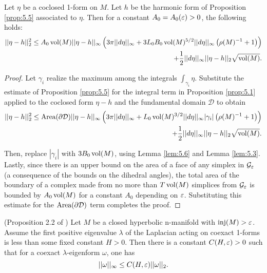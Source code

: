\begin{prop}\label{prop:5.7}
Let $\eta$ be a coclosed 1-form on $M$. Let $h$ be the harmonic form of Proposition \ref{prop:5.5} associated to $\eta$. Then for a constant $A_0 = A_0(\varepsilon)>0$, the following holds:
\begin{align*}
||\eta-h||_2^2 \leq A_0\operatorname{vol}(M)||\eta-h||_{\infty}\left(3\pi||d\eta||_{\infty} + 3L_0B_0\operatorname{vol}(M)^{5/2} ||d\eta||_{\infty} \left(\rho(M)^{-1} + 1\right)\right) \\ + \frac{1}{2}||d\eta||_{\infty}||\eta-h||_2\sqrt{\operatorname{vol}(M)}.
\end{align*}

\end{prop}
\begin{proof}

Let $\gamma_i$ realize the maximum among the integrals $\int_{\gamma_i}\eta$.
Substitute the estimate of Proposition \ref{prop:5.5} for the integral term in Proposition \ref{prop:5.1} applied to the coclosed form $\eta-h$ and the fundamental domain $\mathcal D$ to obtain
\begin{align*}
    ||\eta-h||_2^2 \leq \text{Area}(\partial \mathcal D)||\eta-h||_{\infty}
    \left(3\pi||d\eta||_{\infty} +L_0\operatorname{vol}(M)^{3/2} ||d\eta||_{\infty} |\gamma_i| \left(\rho(M)^{-1} +1 \right)\right) \\ + \frac{1}{2}||d\eta||_{\infty}||\eta-h||_2\sqrt{\operatorname{vol}(M)}.
\end{align*}


Then, replace $|\gamma_i|$ with $3B_0\operatorname{vol}(M)$, using Lemma \ref{lem:5.6} and Lemma \ref{lem:5.3}.
Lastly, since there is an upper bound on the area of a face of any simplex in $\mathcal G_\varepsilon$ (a consequence of the bounds on the dihedral angles), the total area of the boundary of a complex made from no more than $T\operatorname{vol}(M)$ simplices from $\mathcal G_\varepsilon$ is bounded by $A_0\operatorname{vol}(M)$ for a constant $A_0$ depending on $\varepsilon$. Substituting this estimate for the $\text{Area}(\partial \mathcal D)$ term completes the proof.
\end{proof}

\begin{prop}\label{prop:5.8} (Proposition 2.2 of \cite{LS}) Let $M$ be a closed hyperbolic n-manifold with $\operatorname{inj}(M)>\varepsilon$. Assume the first positive eigenvalue $\lambda$ of the Laplacian acting on coexact 1-forms is less than some fixed constant $H>0$. Then there is a constant $C(H,\varepsilon)>0$ such that for a coexact $\lambda$-eigenform $\omega$, one has $$||\omega||_{\infty}\leq C(H,\varepsilon)||\omega||_2.$$
\end{prop}

